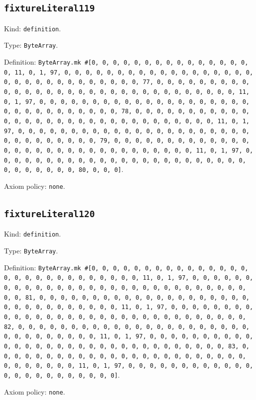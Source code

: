 \documentclass[11pt]{article}
\begin{document}
\subsection*{\texttt{fixtureLiteral119}}
\noindent Kind: \texttt{definition}.\par
\noindent Type: \texttt{ByteArray}.\par
\noindent Definition: \texttt{ByteArray.mk \#[0, 0, 0, 0, 0, 0, 0, 0, 0, 0, 0, 0, 0, 0, 0, 0, 11, 0, 1, 97, 0, 0, 0, 0, 0, 0, 0, 0, 0, 0, 0, 0, 0, 0, 0, 0, 0, 0, 0, 0, 0, 0, 0, 0, 0, 0, 0, 0, 0, 0, 0, 77, 0, 0, 0, 0, 0, 0, 0, 0, 0, 0, 0, 0, 0, 0, 0, 0, 0, 0, 0, 0, 0, 0, 0, 0, 0, 0, 0, 0, 0, 0, 0, 11, 0, 1, 97, 0, 0, 0, 0, 0, 0, 0, 0, 0, 0, 0, 0, 0, 0, 0, 0, 0, 0, 0, 0, 0, 0, 0, 0, 0, 0, 0, 0, 0, 0, 0, 78, 0, 0, 0, 0, 0, 0, 0, 0, 0, 0, 0, 0, 0, 0, 0, 0, 0, 0, 0, 0, 0, 0, 0, 0, 0, 0, 0, 0, 0, 0, 0, 11, 0, 1, 97, 0, 0, 0, 0, 0, 0, 0, 0, 0, 0, 0, 0, 0, 0, 0, 0, 0, 0, 0, 0, 0, 0, 0, 0, 0, 0, 0, 0, 0, 0, 0, 79, 0, 0, 0, 0, 0, 0, 0, 0, 0, 0, 0, 0, 0, 0, 0, 0, 0, 0, 0, 0, 0, 0, 0, 0, 0, 0, 0, 0, 0, 0, 0, 11, 0, 1, 97, 0, 0, 0, 0, 0, 0, 0, 0, 0, 0, 0, 0, 0, 0, 0, 0, 0, 0, 0, 0, 0, 0, 0, 0, 0, 0, 0, 0, 0, 0, 0, 80, 0, 0, 0]}.\par
\noindent Axiom policy: \texttt{none}.\par
\subsection*{\texttt{fixtureLiteral120}}
\noindent Kind: \texttt{definition}.\par
\noindent Type: \texttt{ByteArray}.\par
\noindent Definition: \texttt{ByteArray.mk \#[0, 0, 0, 0, 0, 0, 0, 0, 0, 0, 0, 0, 0, 0, 0, 0, 0, 0, 0, 0, 0, 0, 0, 0, 0, 0, 0, 0, 11, 0, 1, 97, 0, 0, 0, 0, 0, 0, 0, 0, 0, 0, 0, 0, 0, 0, 0, 0, 0, 0, 0, 0, 0, 0, 0, 0, 0, 0, 0, 0, 0, 0, 0, 81, 0, 0, 0, 0, 0, 0, 0, 0, 0, 0, 0, 0, 0, 0, 0, 0, 0, 0, 0, 0, 0, 0, 0, 0, 0, 0, 0, 0, 0, 0, 0, 11, 0, 1, 97, 0, 0, 0, 0, 0, 0, 0, 0, 0, 0, 0, 0, 0, 0, 0, 0, 0, 0, 0, 0, 0, 0, 0, 0, 0, 0, 0, 0, 0, 0, 0, 82, 0, 0, 0, 0, 0, 0, 0, 0, 0, 0, 0, 0, 0, 0, 0, 0, 0, 0, 0, 0, 0, 0, 0, 0, 0, 0, 0, 0, 0, 0, 0, 11, 0, 1, 97, 0, 0, 0, 0, 0, 0, 0, 0, 0, 0, 0, 0, 0, 0, 0, 0, 0, 0, 0, 0, 0, 0, 0, 0, 0, 0, 0, 0, 0, 0, 0, 83, 0, 0, 0, 0, 0, 0, 0, 0, 0, 0, 0, 0, 0, 0, 0, 0, 0, 0, 0, 0, 0, 0, 0, 0, 0, 0, 0, 0, 0, 0, 0, 11, 0, 1, 97, 0, 0, 0, 0, 0, 0, 0, 0, 0, 0, 0, 0, 0, 0, 0, 0, 0, 0, 0, 0, 0, 0, 0]}.\par
\noindent Axiom policy: \texttt{none}.\par
\end{document}
